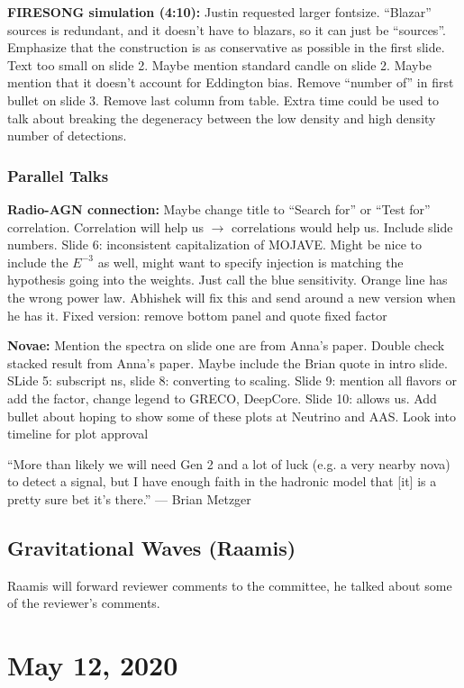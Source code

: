 \textbf{FIRESONG simulation (4:10):} Justin requested larger fontsize. ``Blazar'' sources is redundant, and it doesn't have to blazars, so it can just be ``sources''. Emphasize that the construction is as conservative as possible in the first slide. Text too small on slide 2. Maybe mention standard candle on slide 2. Maybe mention that it doesn't account for Eddington bias. Remove ``number of'' in first bullet on slide 3. Remove last column from table. Extra time could be used to talk about breaking the degeneracy between the low density and high density number of detections.

\subsection{Parallel Talks}
\textbf{Radio-AGN connection:} Maybe change title to ``Search for'' or ``Test for'' correlation. Correlation will help us $\rightarrow$ correlations would help us. Include slide numbers. Slide 6: inconsistent capitalization of MOJAVE. Might be nice to include the $E^{-3}$ as well, might want to specify injection is matching the hypothesis going into the weights. Just call the blue sensitivity. Orange line has the wrong power law. Abhishek will fix this and send around a new version when he has it. Fixed version: remove bottom panel and quote fixed factor

\textbf{Novae:} Mention the spectra on slide one are from Anna's paper. Double check stacked result from Anna's paper. Maybe include the Brian quote in intro slide. SLide 5: subscript ns, slide 8: converting to scaling. Slide 9: mention all flavors or add the factor, change legend to GRECO, DeepCore. Slide 10: allows us. Add bullet about hoping to show some of these plots at Neutrino and AAS. Look into timeline for plot approval

``More than likely we will need Gen 2 and a lot of luck (e.g. a very nearby nova) to detect a signal, but I have enough faith in the hadronic model that [it] is a pretty sure bet it's there.'' — Brian Metzger

\section{Gravitational Waves (Raamis)}
Raamis will forward reviewer comments to the committee, he talked about some of the reviewer's comments. 

\chapter{May 12, 2020}
